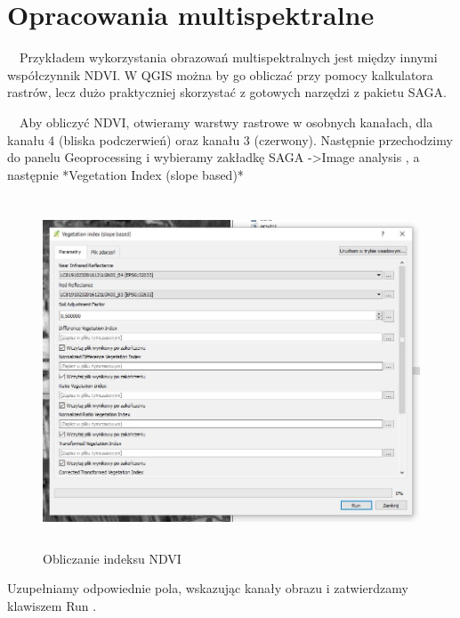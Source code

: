\documentclass[12pt,a4paper]{book}
\begin{document}
\section{Opracowania multispektralne}
\ \ Przykładem wykorzystania obrazowań multispektralnych jest między innymi współczynnik NDVI. W QGIS można by go obliczać przy pomocy kalkulatora rastrów, lecz dużo praktyczniej skorzystać z gotowych narzędzi z pakietu SAGA.

\ \ Aby obliczyć NDVI, otwieramy warstwy rastrowe w osobnych kanałach, dla kanału 4 (bliska podczerwień) oraz kanału 3 (czerwony). Następnie przechodzimy do panelu  Geoprocessing  i wybieramy zakładkę  SAGA -{\textgreater}Image analysis , a następnie *Vegetation Index (slope based)*



\begin{center}
\begin{figure}
\includegraphics[width=13cm,height=10.389cm]{004-saga-ndvi.jpg}
\caption{Obliczanie indeksu NDVI}
\end{figure}
\end{center}
Uzupełniamy odpowiednie pola, wskazując kanały obrazu i zatwierdzamy klawiszem  Run .
\end{document}
